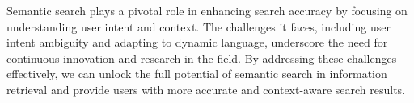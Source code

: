 \documentclass[10pt,oneside,a4paper]{article}
\begin{document}
Semantic search plays a pivotal role in enhancing search accuracy by focusing on understanding user intent and context. The challenges it faces, including user intent ambiguity and adapting to dynamic language, underscore the need for continuous innovation and research in the field. By addressing these challenges effectively, we can unlock the full potential of semantic search in information retrieval and provide users with more accurate and context-aware search results.

\newpage
\nocite{*}


\end{document}
